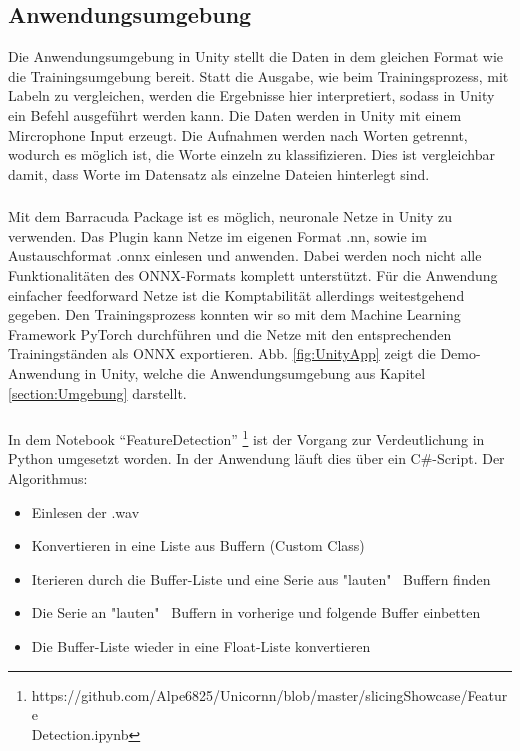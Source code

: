 \documentclass[sigconf]{acmart}
\begin{document}
\subsection{Anwendungsumgebung}
Die Anwendungsumgebung in Unity stellt die Daten in dem gleichen Format wie die Trainingsumgebung bereit. Statt die Ausgabe, wie beim Trainingsprozess,  mit Labeln zu vergleichen, werden die Ergebnisse hier interpretiert, sodass in Unity ein Befehl ausgeführt werden kann. Die Daten werden in Unity mit einem Mircrophone Input erzeugt. Die Aufnahmen werden nach Worten getrennt, wodurch es möglich ist, die Worte einzeln zu klassifizieren. Dies ist vergleichbar damit, dass Worte im Datensatz als einzelne Dateien hinterlegt sind. 

\subsubsection{}
Mit dem Barracuda Package ist es möglich, neuronale Netze in Unity zu verwenden. Das Plugin kann Netze im eigenen Format .nn, sowie im Austauschformat .onnx einlesen und anwenden. Dabei werden noch nicht alle Funktionalitäten des ONNX-Formats komplett unterstützt. Für die Anwendung einfacher feedforward Netze ist die Komptabilität allerdings weitestgehend gegeben. Den Trainingsprozess konnten wir so mit dem Machine Learning Framework PyTorch durchführen und die Netze mit den entsprechenden Trainingständen als ONNX exportieren. Abb. \ref{fig:UnityApp} zeigt die Demo-Anwendung in Unity, welche die Anwendungsumgebung aus Kapitel \ref{section:Umgebung} darstellt. 

\subsubsection{}
In dem Notebook “FeatureDetection” \footnote[1]{https://github.com/Alpe6825/Unicornn/blob/master/slicingShowcase/Feature\\Detection.ipynb}  ist der Vorgang zur Verdeutlichung  in Python umgesetzt worden. In der Anwendung läuft dies über ein C\#-Script. 
\newline
\newline
\noindent Der Algorithmus: 
\begin{itemize}
\item Einlesen der .wav
\item Konvertieren in eine Liste aus Buffern (Custom Class)
\item Iterieren durch die Buffer-Liste und eine Serie aus "lauten" \ Buffern finden
\item Die Serie an "lauten" \ Buffern in vorherige und folgende Buffer einbetten
\item Die Buffer-Liste wieder in eine Float-Liste konvertieren
\end{itemize}
\end{document}
